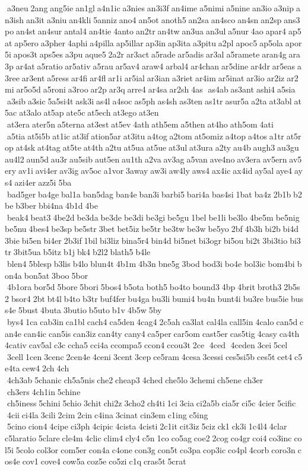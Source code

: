  a3neu 2ang ang5ie an1gl a4n1ic a3nies an3i3f an4ime a5nimi a5nine an3io a3nip an3ish an3it a3niu an4kli 5anniz ano4 an5ot anoth5 an2sa an4sco an4sn an2sp ans3po an4st an4sur antal4 an4tie 4anto an2tr an4tw an3ua an3ul a5nur 4ao apar4 ap5at ap5ero a3pher 4aphi a4pilla ap5illar ap3in ap3ita a3pitu a2pl apoc5 ap5ola apor5i apos3t aps5es a3pu aque5 2a2r ar3act a5rade ar5adis ar3al a5ramete aran4g ara3p ar4at a5ratio ar5ativ a5rau ar5av4 araw4 arbal4 ar4chan ar5dine ar4dr ar5eas a3ree ar3ent a5ress ar4fi ar4fl ar1i ar5ial ar3ian a3riet ar4im ar5inat ar3io ar2iz ar2mi ar5o5d a5roni a3roo ar2p ar3q arre4 ar4sa ar2sh 4as  as4ab as3ant ashi4 a5sia  a3sib a3sic 5a5si4t ask3i as4l a4soc as5ph as4sh as3ten as1tr asur5a a2ta at3abl at5ac at3alo at5ap ate5c at5ech at3ego at3en  at3era ater5n a5terna at3est at5ev 4ath ath5em a5then at4ho ath5om 4ati  a5tia at5i5b at1ic at3if ation5ar at3itu a4tog a2tom at5omiz a4top a4tos a1tr at5rop at4sk at4tag at5te at4th a2tu at5ua at5ue at3ul at3ura a2ty au4b augh3 au3gu au4l2 aun5d au3r au5sib aut5en au1th a2va av3ag a5van ave4no av3era av5ern av5ery av1i avi4er av3ig av5oc a1vor 3away aw3i aw4ly aws4 ax4ic ax4id ay5al aye4 ays4 azi4er azz5i 5ba  bad5ger ba4ge bal1a ban5dag ban4e ban3i barbi5 bari4a bas4si 1bat ba4z 2b1b b2be b3ber bbi4na 4b1d 4be  beak4 beat3 4be2d be3da be3de be3di be3gi be5gu 1bel be1li be3lo 4be5m be5nig be5nu 4bes4 be3sp be5str 3bet bet5iz be5tr be3tw be3w be5yo 2bf 4b3h bi2b bi4d 3bie bi5en bi4er 2b3if 1bil bi3liz bina5r4 bin4d bi5net bi3ogr bi5ou bi2t 3bi3tio bi3tr 3bit5ua b5itz b1j bk4 b2l2 blath5 b4le  blen4 5blesp b3lis b4lo blun4t 4b1m 4b3n bne5g 3bod bod3i bo4e bol3ic bom4bi bon4a bon5at 3boo 5bor  4b1ora bor5d 5bore 5bori 5bos4 b5ota both5 bo4to bound3 4bp 4brit broth3 2b5s2 bsor4 2bt bt4l b4to b3tr buf4fer bu4ga bu3li bumi4 bu4n bunt4i bu3re bus5ie buss4e 5bust 4buta 3butio b5uto b1v 4b5w 5by  bys4 1ca cab3in ca1bl cach4 ca5den 4cag4 2c5ah ca3lat cal4la call5in 4calo can5d can4e can4ic can5is can3iz can4ty cany4 ca5per car5om cast5er cas5tig 4casy ca4th 4cativ cav5al c3c ccha5 cci4a ccompa5 ccon4 ccou3t 2ce  4ced  4ceden 3cei 5cel  3cell 1cen 3cenc 2cen4e 4ceni 3cent 3cep ce5ram 4cesa 3cessi ces5si5b ces5t cet4 c5e4ta cew4 2ch 4ch  4ch3ab 5chanic ch5a5nis che2 cheap3 4ched che5lo 3chemi ch5ene ch3er  ch3ers 4ch1in 5chine  ch5iness 5chini 5chio 3chit chi2z 3cho2 ch4ti 1ci 3cia ci2a5b cia5r ci5c 4cier 5cific  4cii ci4la 3cili 2cim 2cin c4ina 3cinat cin3em c1ing c5ing  5cino cion4 4cipe ci3ph 4cipic 4cista 4cisti 2c1it cit3iz 5ciz ck1 ck3i 1c4l4 4clar 	c5laratio 5clare cle4m 4clic clim4 cly4 c5n 1co co5ag coe2 2cog co4gr coi4 co3inc col5i 5colo col3or com5er con4a c4one con3g con5t co3pa cop3ic co4pl 4corb coro3n cos4e cov1 cove4 cow5a coz5e co5zi c1q cras5t 5crat 